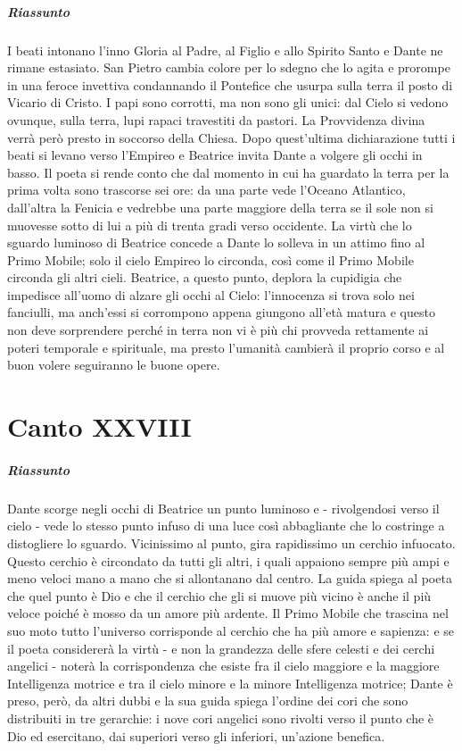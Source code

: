 \documentclass[a4paper, twoside, titlepage]{book}
\begin{document}
\paragraph{Riassunto} I beati intonano l’inno Gloria al Padre, al Figlio e allo Spirito Santo e Dante ne rimane estasiato. San Pietro cambia colore per lo sdegno che lo agita e prorompe in una feroce invettiva condannando il Pontefice che usurpa sulla terra il posto di Vicario di Cristo. I papi sono corrotti, ma non sono gli unici: dal Cielo si vedono ovunque, sulla terra, lupi rapaci travestiti da pastori. La Provvidenza divina verrà però presto in soccorso della Chiesa. Dopo quest’ultima dichiarazione tutti i beati si levano verso l’Empireo e Beatrice invita Dante a volgere gli occhi in basso. Il poeta si rende conto che dal momento in cui ha guardato la terra per la prima volta sono trascorse sei ore: da una parte vede l’Oceano Atlantico, dall’altra la Fenicia e vedrebbe una parte maggiore della terra se il sole non si muovesse sotto di lui a più di trenta gradi verso occidente. La virtù che lo sguardo luminoso di Beatrice concede a Dante lo solleva in un attimo fino al Primo Mobile; solo il cielo Empireo lo circonda, così come il Primo Mobile circonda gli altri cieli. Beatrice, a questo punto, deplora la cupidigia che impedisce all’uomo di alzare gli occhi al Cielo: l’innocenza si trova solo nei fanciulli, ma anch’essi si corrompono appena giungono all’età matura e questo non deve sorprendere perché in terra non vi è più chi provveda rettamente ai poteri temporale e spirituale, ma presto l’umanità cambierà il proprio corso e al buon volere seguiranno le buone opere.

\chapter{Canto XXVIII}

\paragraph{Riassunto} Dante scorge negli occhi di Beatrice un punto luminoso e - rivolgendosi verso il cielo - vede lo stesso punto infuso di una luce così abbagliante che lo costringe a distogliere lo sguardo. Vicinissimo al punto, gira rapidissimo un cerchio infuocato. Questo cerchio è circondato da tutti gli altri, i quali appaiono sempre più ampi e meno veloci mano a mano che si allontanano dal centro. La guida spiega al poeta che quel punto è Dio e che il cerchio che gli si muove più vicino è anche il più veloce poiché è mosso da un amore più ardente. Il Primo Mobile che trascina nel suo moto tutto l’universo corrisponde al cerchio che ha più amore e sapienza: e se il poeta considererà la virtù - e non la grandezza delle sfere celesti e dei cerchi angelici - noterà la corrispondenza che esiste fra il cielo maggiore e la maggiore Intelligenza motrice e tra il cielo minore e la minore Intelligenza motrice; Dante è preso, però, da altri dubbi e la sua guida spiega l’ordine dei cori che sono distribuiti in tre gerarchie: i nove cori angelici sono rivolti verso il punto che è Dio ed esercitano, dai superiori verso gli inferiori, un’azione benefica.
\end{document}
